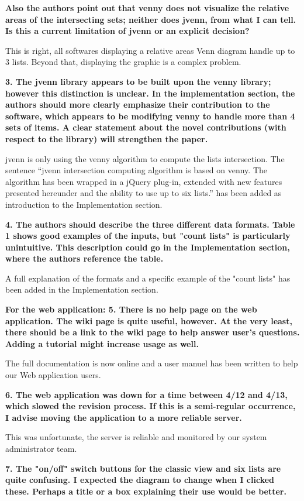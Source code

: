 \documentclass[10pt,stdletter,dateno,sigleft]{newlfm} %
\begin{document}
\begin{newlfm}
\textbf{Also the authors point out that venny does not visualize the relative
areas of the intersecting sets; neither does jvenn, from what I can
tell. Is this a current limitation of jvenn or an explicit decision?}

This is right, all softwares displaying a relative areas Venn diagram handle up
to 3 lists. Beyond that, displaying the graphic is a complex problem.

\textbf{3. The jvenn library appears to be built upon the venny library;
however this distinction is unclear. In the implementation section,
the authors should more clearly emphasize their contribution to the
software, which appears to be modifying venny to handle more than 4
sets of items. A clear statement about the novel contributions (with
respect to the library) will strengthen the paper.}

jvenn is only using the venny algorithm to compute the lists intersection.
The sentence ``jvenn intersection computing algorithm is based on venny.
The algorithm has been wrapped in a jQuery plug-in,
extended with new features presented hereunder and the ability to use up to six
lists.'' has been added as introduction to the Implementation section.


\textbf{4. The authors should describe the three different data formats.
Table 1 shows good examples of the inputs, but "count lists" is
particularly unintuitive. This description could go in the
Implementation section, where the authors reference the table.}

A full explanation of the formats and a specific example of the "count lists"
has been added in the Implementation section.

\textbf{For the web application: 5. There is no help page on the web
application. The wiki page is quite useful, however. At the very least, there
should be a link to the wiki page to help answer user's questions. Adding a 
tutorial might increase usage as well.}

The full documentation is now online and a user manuel has been written to help
our Web application users.

\textbf{6. The web application was down for a time between 4/12 and 4/13,
which slowed the revision process. If this is a semi-regular
occurrence, I advise moving the application to a more reliable server.}

This was unfortunate, the server is reliable and monitored by our system
administrator team.

\textbf{7. The "on/off" switch buttons for the classic view and six lists are
quite confusing. I expected the diagram to change when I clicked
these. Perhaps a title or a box explaining their use would be better.}


\end{newlfm}
\end{document}
